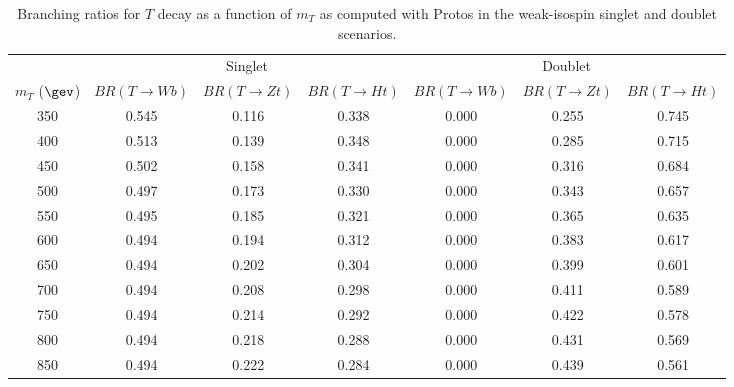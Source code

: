 \begin{table}[h!]
\begin{center}
\begin{tabular}{c c c c c c c}
\hline
\hline
 & \multicolumn{3}{c}{Singlet} &  \multicolumn{3}{c}{Doublet} \\
 $m_{T}$ ($\gev$) & $BR(T \to Wb)$ & $BR(T \to Zt)$ & $BR(T \to Ht)$ & $BR(T \to Wb)$ & $BR(T \to Zt)$ & $BR(T \to Ht)$\\
\hline
350 	&  0.545 	&  0.116 	&  0.338	&  0.000 	&  0.255 	&  0.745 	\\ 
400 	&  0.513 	&  0.139 	&  0.348	&  0.000 	&  0.285 	&  0.715 	\\
450 	&  0.502 	&  0.158 	&  0.341	&  0.000 	&  0.316 	&  0.684 	\\ 
500 	&  0.497 	&  0.173 	&  0.330	&  0.000 	&  0.343 	&  0.657 	\\
550 	&  0.495 	&  0.185 	&  0.321	&  0.000 	&  0.365 	&  0.635 	\\
600 	&  0.494 	&  0.194 	&  0.312	&  0.000 	&  0.383 	&  0.617 	\\ 	
650 	&  0.494 	&  0.202 	&  0.304	&  0.000 	&  0.399 	&  0.601 	\\ 
700 	&  0.494 	&  0.208 	&  0.298	&  0.000 	&  0.411 	&  0.589 	\\ 
750 	&  0.494 	&  0.214 	&  0.292	&  0.000 	&  0.422 	&  0.578 	\\ 
800 	&  0.494 	&  0.218 	&  0.288	&  0.000 	&  0.431 	&  0.569 	\\
850 	&  0.494 	&  0.222 	&  0.284	&  0.000 	&  0.439 	&  0.561 	\\ 
\hline
\hline
\end{tabular}
\caption{\label{tab:BRT} Branching ratios for $T$ decay as a function
of $m_{T}$ as computed with {\sc Protos} in the weak-isospin singlet and doublet scenarios.}
\end{center}
\end{table}
